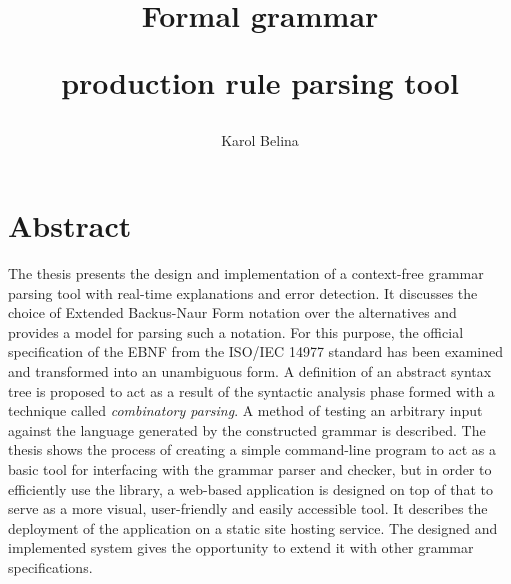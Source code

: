 \documentclass[english,bachelors,forcepolishlogotype]{wizthesis}
\author{Karol Belina}
\title{Formal grammar\par production rule parsing tool}
\begin{document}
\frontmatter %

\maketitle

\chapter*{Abstract}

The thesis presents the design and implementation of a context-free grammar
parsing tool with real-time explanations and error detection. It discusses the
choice of Extended Backus-Naur Form notation over the alternatives and provides
a model for parsing such a notation. For this purpose, the official
specification of the EBNF from the ISO/IEC 14977 standard has been examined and
transformed into an unambiguous form. A definition of an abstract syntax tree is
proposed to act as a result of the syntactic analysis phase formed with a
technique called \emph{combinatory parsing}. A method of testing an arbitrary
input against the language generated by the constructed grammar is described.
The thesis shows the process of creating a simple command-line program to act as
a basic tool for interfacing with the grammar parser and checker, but in order
to efficiently use the library, a web-based application is designed on top of
that to serve as a more visual, user-friendly and easily accessible tool. It
describes the deployment of the application on a static site hosting service.
The designed and implemented system gives the opportunity to extend it with
other grammar specifications.
\end{document}
